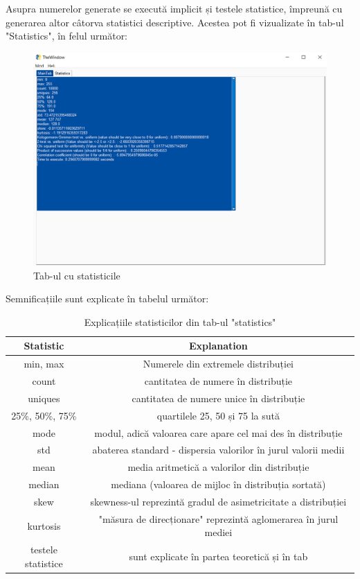 Asupra numerelor generate se execută implicit și testele statistice, împreună cu generarea altor câtorva statistici descriptive. Acestea pot fi vizualizate în tab-ul "Statistics", în felul următor:
\begin{figure}[H]
    \centering
    \includegraphics[width=1.0\textwidth]{continut/capitol3/figuri/Statistici.png}
    \caption{Tab-ul cu statisticile}
    \label{fig:StatisticsWindow}
\end{figure}

Semnificațiile sunt explicate în tabelul următor:
\begin{table}[H]
    \centering
    \begin{tabular}{|c|c|}
        \hline
        Statistic & Explanation \\
        \hline  
         min, max & Numerele din extremele distribuției  \\
         count & cantitatea de numere în distribuție  \\
         uniques & cantitatea de numere unice în distribuție \\
         25\%, 50\%, 75\% & quartilele 25, 50 și 75 la sută \\
         mode & modul, adică valoarea care apare cel mai des în distribuție \\
         std & abaterea standard - dispersia valorilor în jurul valorii medii \\
         mean & media aritmetică a valorilor din distribuție \\
         median & mediana (valoarea de mijloc în distribuția sortată) \\
         skew & skewness-ul reprezintă gradul de asimetricitate a distribuției \\
         kurtosis & "măsura de direcționare" reprezintă aglomerarea în jurul mediei \\
         testele statistice & sunt explicate în partea teoretică și în tab\\
        \hline
    \end{tabular}
    \caption{Explicațiile statisticilor din tab-ul "statistics"}
    \label{tab:StatisticsExplainTable}
\end{table}

